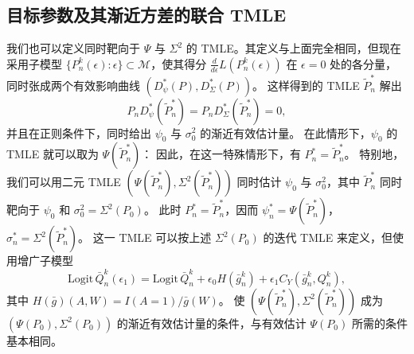\subsection{目标参数及其渐近方差的联合 TMLE}

我们也可以定义同时靶向于 $\Psi$ 与 $\Sigma^2$ 的 TMLE。其定义与上面完全相同，但现在采用子模型
$\{P_n^k(\epsilon):\epsilon\}\subset\mathcal M$，使其得分
$\frac{d}{d\epsilon}L(P_n^k(\epsilon))$ 在 $\epsilon=0$ 处的各分量，同时张成两个有效影响曲线
$(D_\psi^*(P),D_\Sigma^*(P))$。
这样得到的 TMLE $\tilde P_n^*$ 解出
\[
 P_nD_\psi^*(\tilde P_n^*)=P_nD_\Sigma^*(\tilde P_n^*)=0,
\]
并且在正则条件下，同时给出 $\psi_0$ 与 $\sigma_0^2$ 的渐近有效估计量。
在此情形下，$\psi_0$ 的 TMLE 就可以取为 $\Psi(\tilde P_n^*)$：
因此，在这一特殊情形下，有 $P_n^*=\tilde P_n^*$。
特别地，我们可以用二元 TMLE
$(\Psi(\tilde P_n^*),\Sigma^2(\tilde P_n^*))$
同时估计 $\psi_0$ 与 $\sigma_0^2$，其中 $\tilde P_n^*$ 同时靶向于
$\psi_0$ 和 $\sigma_0^2=\Sigma^2(P_0)$。
此时 $P_n^*=\tilde P_n^*$，因而
$\psi_n^*=\Psi(\tilde P_n^*)$，$\sigma_n^*=\Sigma^2(\tilde P_n^*)$。
这一 TMLE 可以按上述 $\Sigma^2(P_0)$ 的迭代 TMLE 来定义，但使用增广子模型
\[
 \mathrm{Logit}\,\bar Q_n^k(\epsilon_1)
 =\mathrm{Logit}\,\bar Q_n^k+\epsilon_0H(\bar g_n^k)
 +\epsilon_1C_Y(\bar g_n^k,Q_n^k),
\]
其中 $H(\bar g)(A,W)=I(A=1)/\bar g(W)$。
使 $(\Psi(\tilde P_n^*),\Sigma^2(\tilde P_n^*))$ 成为
$(\Psi(P_0),\Sigma^2(P_0))$ 的渐近有效估计量的条件，与有效估计 $\Psi(P_0)$ 所需的条件基本相同。
